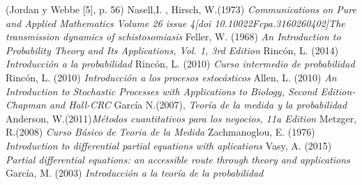 \clearpage
{}
\begin{thebibliography}{25}
 (Jordan y Webbe [5], p.
56)
Nasell,I. , Hirsch, W.(1973)\emph{ Communications on Pure and Applied Mathematics Volume 26 issue 4[doi 10.10022Fcpa.3160260402]The transmission dynamics of schistosomiasis}
Feller, W. (1968)\emph{ An Introduction to Probability Theory and Its Applications, Vol. 1, 3rd Edition}
 Rincón, L. (2014) \emph{Introducción a la probabilidad}
 Rincón, L. (2010) \emph{Curso intermedio de probabilidad}
 Rincón, L. (2010) \emph{ Introducción a los procesos estocásticos}
 Allen, L. (2010)\emph{ An Introduction to Stochastic Processes with Applications to Biology, Second Edition-Chapman and Hall-CRC}
 García N.(2007), \emph{Teoría de la medida y la probabilidad}
 Anderson, W.(2011)\emph{Métodos cuantitativos para los negocios, 11a Edition}
 Metzger, R.(2008) \emph{Curso Básico de Teoria de la Medida}
 Zachmanoglou, E. (1976) \emph{Introduction to differential partial equations with aplications}
 Vasy, A. (2015) \emph{Partial differential equations: an accessible route through theory and applications}
 García, M. (2003) \emph{Introducción a la teoría de la probabilidad}
\end{thebibliography}

